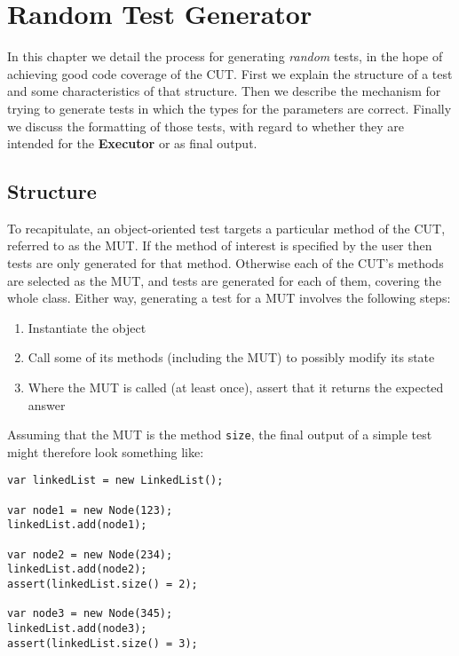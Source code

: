 \chapter{Random Test Generator}

In this chapter we detail the process for generating \emph{random} tests, in the hope of achieving good code coverage of the CUT. First we explain the structure of a test and some characteristics of that structure. Then we describe the mechanism for trying to generate tests in which the types for the parameters are correct. Finally we discuss the formatting of those tests, with regard to whether they are intended for the \textbf{Executor} or as final output.

\section{Structure}

To recapitulate, an object-oriented test targets a particular method of the CUT, referred to as the MUT. If the method of interest is specified by the user then tests are only generated for that method. Otherwise each of the CUT's methods are selected as the MUT, and tests are generated for each of them, covering the whole class. Either way, generating a test for a MUT involves the following steps:

\begin{enumerate}
	\item Instantiate the object
	\item Call some of its methods (including the MUT) to possibly modify its state
	\item Where the MUT is called (at least once), assert that it returns the expected answer
\end{enumerate}

Assuming that the MUT is the method \texttt{size}, the final output of a simple test might therefore look something like:

\begin{lstlisting}[caption=Output unit test,label=final]
var linkedList = new LinkedList();

var node1 = new Node(123);
linkedList.add(node1);

var node2 = new Node(234);
linkedList.add(node2);
assert(linkedList.size() = 2);

var node3 = new Node(345);
linkedList.add(node3);
assert(linkedList.size() = 3);
\end{lstlisting}


